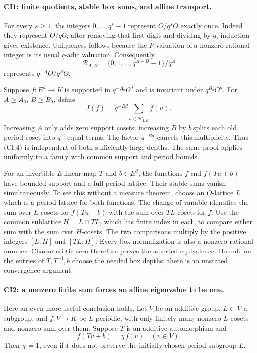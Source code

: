 \paragraph{CI1: finite quotients, stable box sums, and affine transport.}
For every $s\ge1$, the integers $0,\ldots,q^s-1$ represent $O/q^sO$
exactly once. Indeed they represent $O/qO$; after removing that first
digit and dividing by $q$, induction gives existence. Uniqueness
follows because the $P$-valuation of a nonzero rational integer is
its usual $q$-adic valuation. Consequently
\[
 \mathcal B_{A,B}=\{0,1,\ldots,q^{A+B}-1\}/q^A
 \tag{CI.3}
\]
represents $q^{-A}O/q^BO$.

Suppose $f:E^d\to K$ is supported in $q^{-A_0}O^d$ and is invariant
under $q^{B_0}O^d$. For $A\ge A_0$, $B\ge B_0$, define
\[
 I(f)=q^{-Bd}\sum_{u\in\mathcal B_{A,B}^d}f(u).
 \tag{CI.4}
\]
Increasing $A$ only adds zero support cosets; increasing $B$ by $b$
splits each old period coset into $q^{bd}$ equal terms. The factor
$q^{-Bd}$ cancels this multiplicity. Thus (CI.4) is independent of
both sufficiently large depths. The same proof applies uniformly
to a family with common support and period bounds.

For an invertible $E$-linear map $T$ and $b\in E^d$, the functions
$f$ and $f(Tu+b)$ have bounded support and a full period lattice.
Their stable sums vanish simultaneously. To see this without a
measure theorem, choose an $O$-lattice $L$ which is a period lattice
for both functions. The change of variable identifies the sum over
$L$-cosets for $f(Tu+b)$ with the sum over $TL$-cosets for $f$.
Use the common sublattice $H=L\cap TL$, which has finite index in
each, to compare either sum with the sum over $H$-cosets. The two
comparisons multiply by the positive integers $[L:H]$ and $[TL:H]$.
Every box normalization is also a nonzero rational number.
Characteristic zero therefore proves the asserted equivalence.
Bounds on the entries of $T,T^{-1},b$ choose the needed box depths;
there is no unstated convergence argument.

\paragraph{CI2: a nonzero finite sum forces an affine eigenvalue to be one.}
Here an even more useful conclusion holds. Let $V$ be an additive
group, $L\subset V$ a subgroup, and $f:V\to K$ be $L$-periodic,
with only finitely many nonzero $L$-cosets and nonzero sum over them.
Suppose $T$ is an additive automorphism and
\[
 f(Tv+b)=\chi f(v)\quad(v\in V).
 \tag{CI.5}
\]
Then $\chi=1$, even if $T$ does not preserve the initially chosen
period subgroup $L$.

